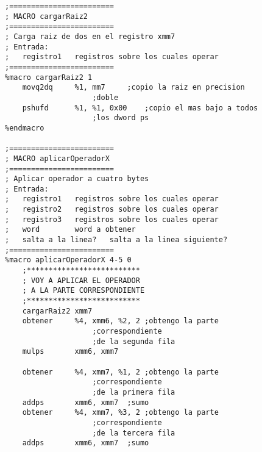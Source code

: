 \documentclass[11pt]{article}
\begin{document}
\begin{enumerate}
\begin{lstlisting}[frame=single]
;========================
; MACRO cargarRaiz2
;========================
; Carga raiz de dos en el registro xmm7
; Entrada:
;	registro1	registros sobre los cuales operar 
;========================
%macro cargarRaiz2 1
 	movq2dq		%1, mm7		;copio la raiz en precision 
					;doble
	pshufd		%1, %1, 0x00 	;copio el mas bajo a todos 
					;los dword ps
%endmacro

;========================
; MACRO aplicarOperadorX
;========================
; Aplicar operador a cuatro bytes
; Entrada:
;	registro1	registros sobre los cuales operar 
;	registro2	registros sobre los cuales operar 
;	registro3	registros sobre los cuales operar 
;	word		word a obtener
;	salta a la linea?	salta a la linea siguiente?
;========================
%macro aplicarOperadorX 4-5 0
	;**************************
	; VOY A APLICAR EL OPERADOR
	; A LA PARTE CORRESPONDIENTE
	;**************************
	cargarRaiz2	xmm7
	obtener		%4, xmm6, %2, 2	;obtengo la parte
					;correspondiente
					;de la segunda fila
	mulps		xmm6, xmm7

	obtener 	%4, xmm7, %1, 2	;obtengo la parte
					;correspondiente
					;de la primera fila
	addps		xmm6, xmm7	;sumo
	obtener		%4, xmm7, %3, 2	;obtengo la parte
					;correspondiente
					;de la tercera fila
	addps		xmm6, xmm7	;sumo


\end{lstlisting}
\end{enumerate}
\end{document}
